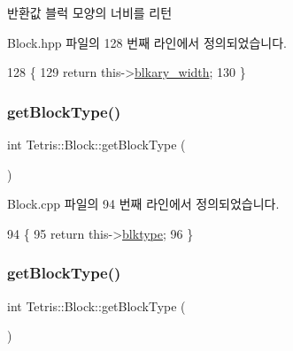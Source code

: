 \begin{DoxyReturn}{반환값}
블럭 모양의 너비를 리턴 
\end{DoxyReturn}


Block.\+hpp 파일의 128 번째 라인에서 정의되었습니다.


\begin{DoxyCode}
128                                     \{
129                 \textcolor{keywordflow}{return} this->\hyperlink{class_tetris_1_1_block_a96548cab58eb788af744b54192c7bea1}{blkary\_width};
130             \}
\end{DoxyCode}
\mbox{\label{class_tetris_1_1_block_a8780b7c5d836c3bb6bae3de5cdcba5e1}} 
\subsubsection{\texorpdfstring{get\+Block\+Type()}{getBlockType()}\hspace{0.1cm}{\footnotesize\ttfamily [1/2]}}
{\footnotesize\ttfamily int Tetris\+::\+Block\+::get\+Block\+Type (\begin{DoxyParamCaption}{ }\end{DoxyParamCaption})}



Block.\+cpp 파일의 94 번째 라인에서 정의되었습니다.


\begin{DoxyCode}
94                        \{
95                 \textcolor{keywordflow}{return} this->\hyperlink{class_tetris_1_1_block_aceac58dcf8d8afaa82c2bab101cb3cff}{blktype};
96             \}
\end{DoxyCode}
\mbox{\label{class_tetris_1_1_block_a8780b7c5d836c3bb6bae3de5cdcba5e1}} 
\subsubsection{\texorpdfstring{get\+Block\+Type()}{getBlockType()}\hspace{0.1cm}{\footnotesize\ttfamily [2/2]}}
{\footnotesize\ttfamily int Tetris\+::\+Block\+::get\+Block\+Type (\begin{DoxyParamCaption}{ }\end{DoxyParamCaption})\hspace{0.3cm}{\ttfamily [inline]}}

